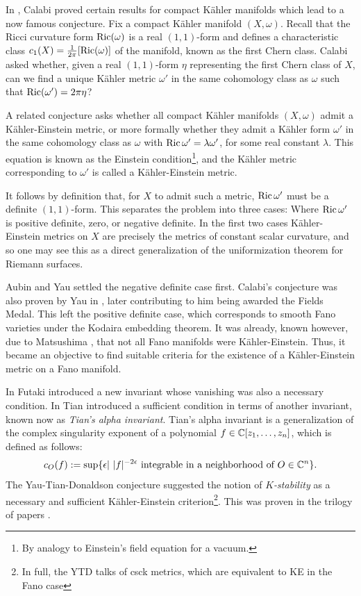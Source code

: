 In \cite{calabi54,calabi57}, Calabi proved certain results for compact K\"ahler manifolds which lead to a now famous conjecture. Fix a compact K\"ahler manifold \((X,\omega)\). Recall that the Ricci curvature form \(\mathop{\rm Ric}\nolimits(\omega)\) is a real \((1,1)\)-form and defines a characteristic class \(c_1(X) = \frac{1}{2 \pi} [ \mathop{\rm Ric}\nolimits(\omega)] \) of the manifold, known as the first Chern class. Calabi asked whether, given a real \((1,1)\)-form \( \eta \) representing the first Chern class of \(X\), can we find a unique K\"ahler metric \(\omega'\) in the same cohomology class as \(\omega\) such that \(\mathop{\rm Ric}\nolimits(\omega') = 2 \pi \eta\)?

A related conjecture asks whether all compact K\"ahler manifolds \((X,\omega)\) admit a K\"ahler-Einstein metric, or more formally whether they admit a K\"ahler form \(\omega'\) in the same cohomology class as \(\omega\) with \(\mathop{\rm Ric}\nolimits \omega' = \lambda \omega'\), for some real constant \(\lambda\). This equation is known as the Einstein condition\footnote{By analogy to Einstein's field equation for a vacuum.}, and the K\"ahler metric corresponding to \(\omega'\) is called a K\"ahler-Einstein metric.

It follows by definition that, for \(X\) to admit such a metric, \(\mathop{\rm Ric}\nolimits \omega'\) must be a definite \((1,1)\)-form. This separates the problem into three cases: Where \(\mathop{\rm Ric}\nolimits \omega' \) is positive definite, zero, or negative definite. In the first two cases K\"ahler-Einstein metrics on \(X\) are precisely the metrics of constant scalar curvature, and so one may see this as a direct generalization of the uniformization theorem for Riemann surfaces.

Aubin \cite{Aubin1976} and Yau \cite{Yau1977} settled the negative definite case first. Calabi's conjecture was also proven by Yau in \cite{Yau1977}, later contributing to him being awarded the Fields Medal. This left the positive definite case, which corresponds to smooth Fano varieties under the Kodaira embedding theorem. It was already, known however, due to Matsushima \cite{matsushima1957structure}, that not all Fano manifolds were K\"ahler-Einstein. Thus, it became an objective to find suitable criteria for the existence of a K\"ahler-Einstein metric on a Fano manifold.

In \cite{futaki1983obstruction} Futaki introduced a new invariant whose vanishing was also a necessary condition. In \cite{tian1987kahler} Tian introduced a sufficient condition in terms of another invariant, known now as \textit{Tian's alpha invariant}.
Tian's alpha invariant is a generalization of the complex singularity exponent of a polynomial \(f \in \mathbb{C}[z_1,\dots,z_n]\), which is defined as follows:
\[
c_O(f) := \sup \{ \epsilon | \ |f|^{-2 \epsilon} \text{ integrable  in a neighborhood of } O \in \mathbb{C}^n \} .
\]
The Yau-Tian-Donaldson conjecture suggested the notion of \textit{ \(K\)-stability} as a necessary and sufficient K\"ahler-Einstein criterion\footnote{In full, the YTD talks of csck metrics, which are equivalent to KE in the Fano case}. This was proven in the trilogy of papers \cite{chen2015kahler1,chen2015kahler2,chen2015kahler3}.

